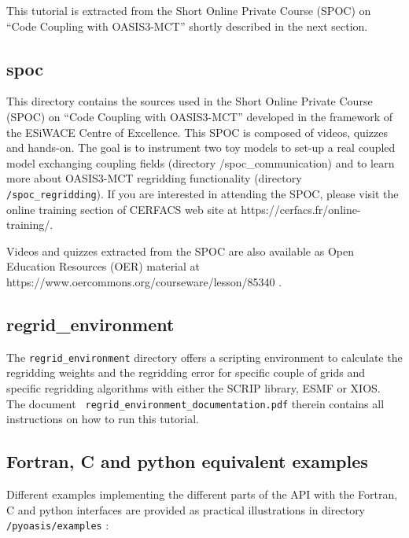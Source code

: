 This tutorial is extracted from the Short Online Private Course (SPOC)
on “Code Coupling with OASIS3-MCT” shortly described in the next section. 

\subsection{spoc}
\label{subsec_spoc}

This directory contains the sources used in the Short Online Private
Course (SPOC) on “Code Coupling with OASIS3-MCT” developed in the
framework of the ESiWACE Centre of Excellence. This SPOC is composed
of videos, quizzes and hands-on. The goal is to instrument two toy
models to set-up a real coupled model exchanging coupling fields (directory
  /spoc\_communication) and to learn more about OASIS3-MCT regridding
functionality (directory {\tt /spoc\_regridding}). If you are interested in
attending the SPOC, please visit the online training section of
CERFACS web site at https://cerfacs.fr/online-training/.

Videos and quizzes extracted from the SPOC are also available
as Open Education Resources (OER) material at https://www.oercommons.org/courseware/lesson/85340 .

\subsection{regrid\_environment}
\label{subsec_regrid}

The {\tt regrid\_environment} directory offers a scripting environment to
calculate the regridding weights and the regridding error for specific
couple of grids and specific regridding algorithms with either the
SCRIP library, ESMF or XIOS. The document {\tt
  regrid\_environment\_documentation.pdf} therein contains all
instructions on how to run this tutorial.

\subsection{Fortran, C and python equivalent examples}
\label{subsec_equivalent}

Different examples implementing the different parts of the API with the Fortran, C and python interfaces are provided as practical illustrations in directory {\tt /pyoasis/examples} :

